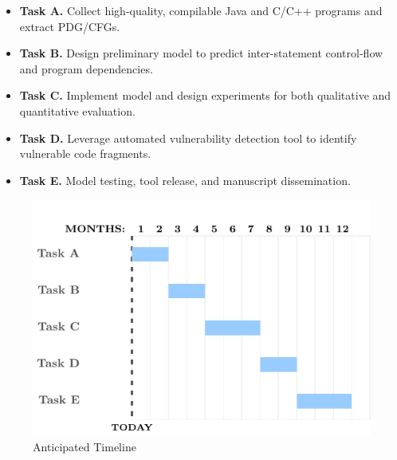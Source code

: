 \begin{itemize}
    \item {\bf Task A.} Collect high-quality, compilable Java and C/C++ programs and extract PDG/CFGs.
    \item {\bf Task B.} Design preliminary model to predict inter-statement control-flow and program dependencies.
    \item {\bf Task C.} Implement model and design experiments for both qualitative and quantitative evaluation.
    \item {\bf Task D.} Leverage automated vulnerability detection tool to identify vulnerable code fragments.
    \item {\bf Task E.} Model testing, tool release, and manuscript dissemination.
\end{itemize}

\begin{figure}[h]
    \centering
    \includegraphics{gannt_charts/gannt.pdf}
    \caption{Anticipated Timeline}
    \label{fig:timeline}
\end{figure}


